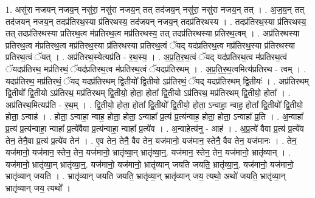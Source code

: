 \documentclass[17pt]{extarticle}
\begin{document}
1. असु॑रा नजयन् नजय॒न् नसु॑रा॒ नसु॑रा नजय॒न् तत् तद॑जय॒न् नसु॑रा॒ नसु॑रा नजय॒न् तत् । . अ॒ज॒य॒न् तत् तद॑जयन् नजय॒न् तदप्र॑तिरथ॒स्या प्र॑तिरथस्य॒ तद॑जयन् नजय॒न् तदप्र॑तिरथस्य । . तदप्र॑तिरथ॒स्या प्र॑तिरथस्य॒ तत् तदप्र॑तिरथस्या प्रतिरथ॒त्व म॑प्रतिरथ॒त्व मप्र॑तिरथस्य॒ तत् तदप्र॑तिरथस्या प्रतिरथ॒त्वम् । . अप्र॑तिरथस्या प्रतिरथ॒त्व म॑प्रतिरथ॒त्व मप्र॑तिरथ॒स्या प्र॑तिरथस्या प्रतिरथ॒त्वं ॅयद् यद॑प्रतिरथ॒त्व मप्र॑तिरथ॒स्या प्र॑तिरथस्या प्रतिरथ॒त्वं ॅयत् । . अप्र॑तिरथ॒स्येत्यप्र॑ति - र॒थ॒स्य॒ । . अ॒प्र॒ति॒र॒थ॒त्वं ॅयद् यद॑प्रतिरथ॒त्व म॑प्रतिरथ॒त्वं ॅयदप्र॑तिरथ॒ मप्र॑तिरथं॒ ॅयद॑प्रतिरथ॒त्व म॑प्रतिरथ॒त्वं ॅयदप्र॑तिरथम् । . अ॒प्र॒ति॒र॒थ॒त्वमित्य॑प्रतिरथ - त्वम् । . यदप्र॑तिरथ॒ मप्र॑तिरथं॒ ॅयद् यदप्र॑तिरथम् द्वि॒तीयो᳚ द्वि॒तीयो ऽप्र॑तिरथं॒ ॅयद् यदप्र॑तिरथम् द्वि॒तीयः॑ । . अप्र॑तिरथम् द्वि॒तीयो᳚ द्वि॒तीयो ऽप्र॑तिरथ॒ मप्र॑तिरथम् द्वि॒तीयो॒ होता॒ होता᳚ द्वि॒तीयो ऽप्र॑तिरथ॒ मप्र॑तिरथम् द्वि॒तीयो॒ होता᳚ । . अप्र॑तिरथ॒मित्यप्र॑ति - र॒थ॒म् । . द्वि॒तीयो॒ होता॒ होता᳚ द्वि॒तीयो᳚ द्वि॒तीयो॒ होता॒ ऽन्वाहा॒ न्वाह॒ होता᳚ द्वि॒तीयो᳚ द्वि॒तीयो॒ होता॒ ऽन्वाह॑ । . होता॒ ऽन्वाहा॒ न्वाह॒ होता॒ होता॒ ऽन्वाहा᳚ प्र॒त्य॑ प्र॒त्य॑न्वाह॒ होता॒ होता॒ ऽन्वाहा᳚ प्र॒ति । . अ॒न्वाहा᳚ प्र॒त्य॑ प्र॒त्य॑न्वाहा॒ न्वाहा᳚ प्र॒त्ये॑वैवा प्र॒त्य॑न्वाहा॒ न्वाहा᳚ प्र॒त्ये॑व । . अ॒न्वाहेत्य॑नु - आह॑ । . अ॒प्र॒त्ये॑ वैवा प्र॒त्य॑ प्र॒त्ये॑व तेन॒ तेनै॒वा प्र॒त्य॑ प्र॒त्ये॑व तेन॑ । . ए॒व तेन॒ तेनै॒ वैव तेन॒ यज॑मानो॒ यज॑मान॒ स्तेनै॒ वैव तेन॒ यज॑मानः । . तेन॒ यज॑मानो॒ यज॑मान॒ स्तेन॒ तेन॒ यज॑मानो॒ भ्रातृ॑व्या॒न् भ्रातृ॑व्या॒न्॒. यज॑मान॒ स्तेन॒ तेन॒ यज॑मानो॒ भ्रातृ॑व्यान् । . यज॑मानो॒ भ्रातृ॑व्या॒न् भ्रातृ॑व्या॒न्॒. यज॑मानो॒ यज॑मानो॒ भ्रातृ॑व्यान् जयति जयति॒ भ्रातृ॑व्या॒न्॒. यज॑मानो॒ यज॑मानो॒ भ्रातृ॑व्यान् जयति । . भ्रातृ॑व्यान् जयति जयति॒ भ्रातृ॑व्या॒न् भ्रातृ॑व्यान् जय॒ त्यथो॒ अथो॑ जयति॒ भ्रातृ॑व्या॒न् भ्रातृ॑व्यान् जय॒ त्यथो᳚ । \newline
\end{document}
